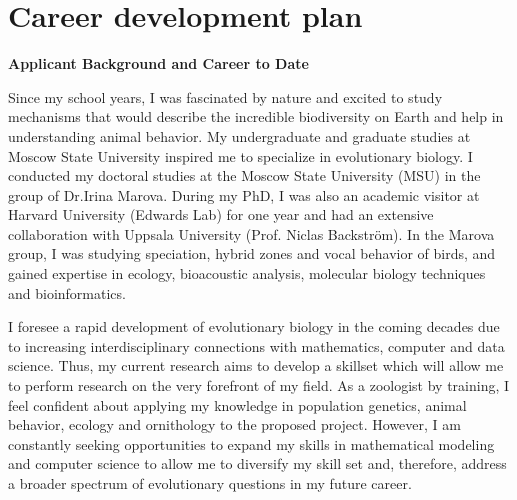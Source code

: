 \documentclass[11pt,a4paper]{article}
\begin{document}
\setcounter{page}{1}











\section{Career development plan}
{\bf \large Applicant Background and Career to Date}

Since my school years, I was fascinated by nature and excited to study mechanisms that would describe the incredible biodiversity on Earth and help in understanding animal behavior. My undergraduate and graduate studies at Moscow State University inspired me to specialize in evolutionary biology. I conducted my doctoral studies at the Moscow State University (MSU) in the group of Dr.Irina Marova. During my PhD, I was also an academic visitor at Harvard University (Edwards Lab) for one year and had an extensive collaboration with Uppsala University (Prof. Niclas Backström). In the Marova group, I was studying speciation, hybrid zones and vocal behavior of  birds, and gained expertise in ecology, bioacoustic analysis, molecular biology techniques and bioinformatics.

I foresee a rapid development of evolutionary biology in the coming decades due to increasing interdisciplinary connections with mathematics, computer and data science. Thus, my current research aims to develop a skillset which will allow me to perform research on the very forefront of my field. As a zoologist by training, I feel confident about applying my knowledge in population genetics, animal behavior, ecology and ornithology to the proposed project. However, I am constantly seeking opportunities to expand my skills in mathematical modeling and computer science to allow me to diversify my skill set and, therefore, address a broader spectrum of evolutionary questions in my future career. \\
\end{document}
